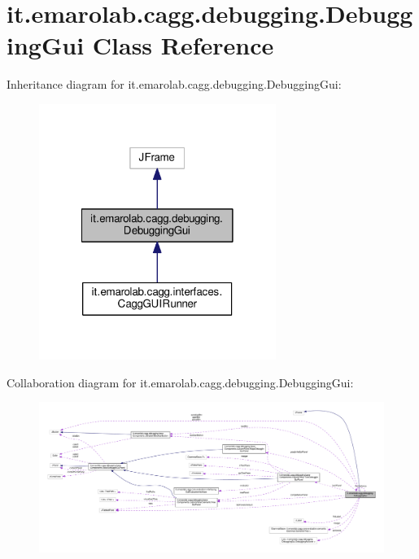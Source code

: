 \hypertarget{classit_1_1emarolab_1_1cagg_1_1debugging_1_1DebuggingGui}{\section{it.\-emarolab.\-cagg.\-debugging.\-Debugging\-Gui Class Reference}
\label{classit_1_1emarolab_1_1cagg_1_1debugging_1_1DebuggingGui}
}


Inheritance diagram for it.\-emarolab.\-cagg.\-debugging.\-Debugging\-Gui\-:\nopagebreak
\begin{figure}[H]
\begin{center}
\leavevmode
\includegraphics[width=218pt]{classit_1_1emarolab_1_1cagg_1_1debugging_1_1DebuggingGui__inherit__graph}
\end{center}
\end{figure}


Collaboration diagram for it.\-emarolab.\-cagg.\-debugging.\-Debugging\-Gui\-:\nopagebreak
\begin{figure}[H]
\begin{center}
\leavevmode
\includegraphics[width=350pt]{classit_1_1emarolab_1_1cagg_1_1debugging_1_1DebuggingGui__coll__graph}
\end{center}
\end{figure}
